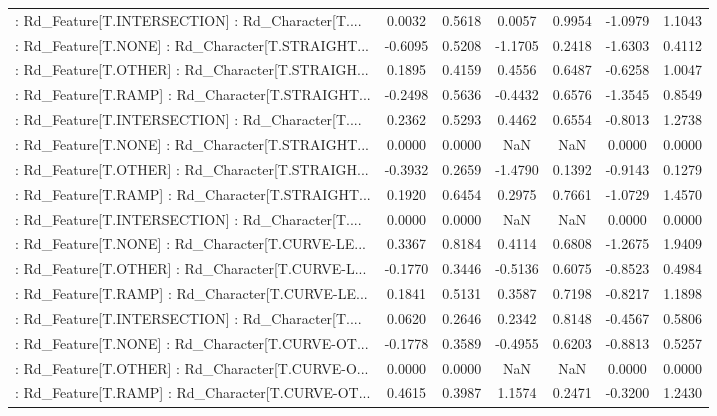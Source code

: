 \begin{longtable}{p{4cm}cccccc}
 : Rd\_Feature[T.INTERSECTION] : Rd\_Character[T.... &  0.0032 &    0.5618 &  0.0057 &       0.9954 & -1.0979 &  1.1043 \\
 : Rd\_Feature[T.NONE] : Rd\_Character[T.STRAIGHT... & -0.6095 &    0.5208 & -1.1705 &       0.2418 & -1.6303 &  0.4112 \\
 : Rd\_Feature[T.OTHER] : Rd\_Character[T.STRAIGH... &  0.1895 &    0.4159 &  0.4556 &       0.6487 & -0.6258 &  1.0047 \\
 : Rd\_Feature[T.RAMP] : Rd\_Character[T.STRAIGHT... & -0.2498 &    0.5636 & -0.4432 &       0.6576 & -1.3545 &  0.8549 \\
 : Rd\_Feature[T.INTERSECTION] : Rd\_Character[T.... &  0.2362 &    0.5293 &  0.4462 &       0.6554 & -0.8013 &  1.2738 \\
 : Rd\_Feature[T.NONE] : Rd\_Character[T.STRAIGHT... &  0.0000 &    0.0000 &     NaN &          NaN &  0.0000 &  0.0000 \\
 : Rd\_Feature[T.OTHER] : Rd\_Character[T.STRAIGH... & -0.3932 &    0.2659 & -1.4790 &       0.1392 & -0.9143 &  0.1279 \\
 : Rd\_Feature[T.RAMP] : Rd\_Character[T.STRAIGHT... &  0.1920 &    0.6454 &  0.2975 &       0.7661 & -1.0729 &  1.4570 \\
 : Rd\_Feature[T.INTERSECTION] : Rd\_Character[T.... &  0.0000 &    0.0000 &     NaN &          NaN &  0.0000 &  0.0000 \\
 : Rd\_Feature[T.NONE] : Rd\_Character[T.CURVE-LE... &  0.3367 &    0.8184 &  0.4114 &       0.6808 & -1.2675 &  1.9409 \\
 : Rd\_Feature[T.OTHER] : Rd\_Character[T.CURVE-L... & -0.1770 &    0.3446 & -0.5136 &       0.6075 & -0.8523 &  0.4984 \\
 : Rd\_Feature[T.RAMP] : Rd\_Character[T.CURVE-LE... &  0.1841 &    0.5131 &  0.3587 &       0.7198 & -0.8217 &  1.1898 \\
 : Rd\_Feature[T.INTERSECTION] : Rd\_Character[T.... &  0.0620 &    0.2646 &  0.2342 &       0.8148 & -0.4567 &  0.5806 \\
 : Rd\_Feature[T.NONE] : Rd\_Character[T.CURVE-OT... & -0.1778 &    0.3589 & -0.4955 &       0.6203 & -0.8813 &  0.5257 \\
 : Rd\_Feature[T.OTHER] : Rd\_Character[T.CURVE-O... &  0.0000 &    0.0000 &     NaN &          NaN &  0.0000 &  0.0000 \\
 : Rd\_Feature[T.RAMP] : Rd\_Character[T.CURVE-OT... &  0.4615 &    0.3987 &  1.1574 &       0.2471 & -0.3200 &  1.2430 \\

\end{longtable}
